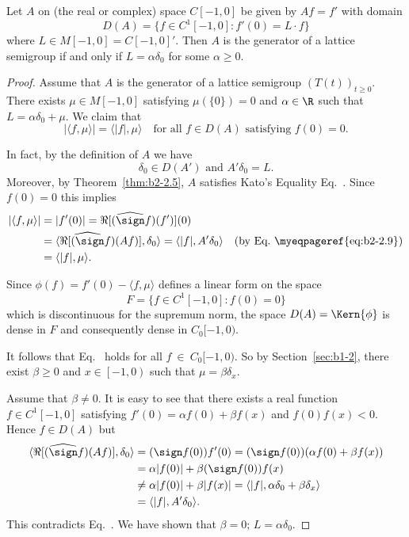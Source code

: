 \begin{example}\label{ex:b2-2.13}
Let $A$ on (the real or complex) space $C[-1,0]$ be given by $Af = f'$ with domain 
%
\[
	D(A) = \{f \in C^{1}[-1,0] \colon f'(0) = L \cdot f\}
\]
%
where $L \in M[-1,0] = C[-1,0]'$.
Then $A$ is the generator of a lattice semigroup if and only if\/ $L = \alpha\delta_{0}$ for some $\alpha \geq 0$.
\end{example}
\begin{proof}
Assume that $A$ is the generator of a lattice semigroup $(T(t))_{t \geq 0}$.
There exists $\mu \in M[-1,0]$ satisfying $\mu(\{0\}) = 0$ and $\alpha \in \R$ such that $L = \alpha\delta_{0} + \mu$.
We claim that
\begin{equation}\label{eq:b2-2.18}
|\langle f,\mu \rangle| = \langle |f|,\mu \rangle \quad \text{for all } f \in D(A) \text{ satisfying } f(0) = 0.
\end{equation}

In fact, by the definition of\/ $A$ we have
\begin{equation}\label{eq:b2-2.19}
\delta_{0} \in D(A') \text{ and } A'\delta_{0} = L.
\end{equation}
Moreover, by Theorem~\ref{thm:b2-2.5}, $A$ satisfies Kato's Equality Eq.~.
Since $f(0) = 0$ this implies
\begin{align*}
|\langle f,\mu \rangle| &= |f'(0)| = \Re[(\widehat{\sign} f)(f')](0) \\
&= \langle \Re[\widehat{(\sign} f)(Af)],\delta_{0} \rangle = \langle |f|,A'\delta_{0} \rangle \quad \text{(by Eq.~\myeqpageref{eq:b2-2.9})} \\
&= \langle |f|,\mu \rangle.
\end{align*}

Since $\phi(f) = f'(0) - \langle f,\mu \rangle$ defines a linear form on the space 
\[
F = \{f \in C^{1}[-1,0] \colon f(0) = 0\}
\]
 which is discontinuous for the supremum norm, the space $D(A) = \Kern{\phi}$ is dense in $F$ and consequently dense in $C_{0}[-1,0)$.
 
It follows that Eq.~ holds for all $f~\in~C_{0}[-1,0)$.
So by Section~\ref{sec:b1-2}, there exist $\beta \geq 0$ and $x \in \left[-1,0\right)$ such that $\mu = \beta\delta_{x}$.

Assume that $\beta \neq 0$.
It is easy to see that there exists a real function $f \in C^{1}[-1,0]$ satisfying 
$f'(0) = \alpha f(0) + \beta f(x)$ and $f(0)f(x) < 0$.
Hence $f \in D(A)$ but 
\begin{align*}
\langle \Re[(\widehat{\sign} f)(Af)],\delta_{0} \rangle 
	&= (\sign f(0))f'(0) 
	= (\sign f(0))(\alpha f(0) + \beta f(x))\\
	&= \alpha|f(0)| + \beta(\sign f(0))f(x) \\
	&\neq \alpha|f(0)| + \beta|f(x)| 
	= \langle |f|, \alpha\delta_{0} + \beta\delta_{x} \rangle \\ 
	&= \langle |f|,A'\delta_{0} \rangle.
\end{align*}
This contradicts Eq.~.
We have shown that $\beta = 0$; \ie  $L = \alpha\delta_{0}$.


\end{proof}
